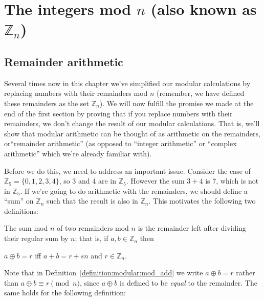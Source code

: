 \section{The integers mod $n$ (also known as ${\mathbb Z}_n$)\quad
{}}\label{sec:intMod_n}

\subsection{Remainder arithmetic}\label{ArithWithRems}
Several times now in this chapter we've simplified our modular calculations by replacing numbers with their remainders mod $n$ (remember, we have defined these remainders as the set ${\mathbb Z}_n$).  We will now fulfill the promise we made at the end of the first section by proving that if you replace numbers with their remainders, we don't change the result of our modular calculations.  That is, we'll show that modular arithmetic can be thought of as arithmetic on the remainders, or``remainder arithmetic'' (as opposed to ``integer arithmetic'' or ``complex arithmetic'' which we're already familiar with).

Before we do this, we need to address an important issue. Consider the case of $\mathbb{Z}_5 = \{0,1,2,3,4\}$, so 3 and 4 are in $\mathbb{Z}_5$. However the sum $3 + 4$ is 7, which is not in $\mathbb{Z}_5$. If we're going to do arithmetic with the remainders, we should define a ``sum'' on $\mathbb{Z}_n$ such that the result is also in $\mathbb{Z}_n$. This motivates the following two definitions:




\begin{defn}\label{definition:modular:mod_add}

\noindent
The sum mod $n$ of two remainders mod $n$ is the remainder left after dividing their regular sum by $n$; that is, if $a,b \in {\mathbb Z}_n$ then

\begin{center}
$a \oplus b = r$ iff  $a + b = r + sn$ and 
$r \in {\mathbb Z}_n.$
\end{center}
\end{defn}
Note that in Definition~\ref{definition:modular:mod_add} we write $a \oplus b = r$ rather than $a \oplus b \equiv r \pmod{n}$, since $a \oplus b$ is defined to be \emph{equal} to the remainder. The same holds for the following definition:

